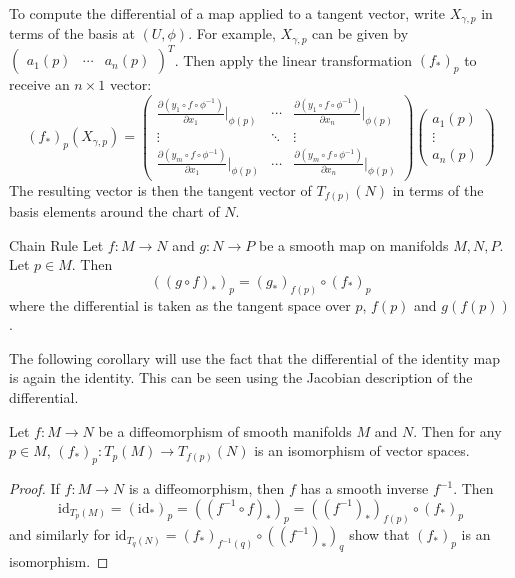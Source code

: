 \documentclass[a4paper]{article}
\begin{document}
To  compute the differential of a map applied to a tangent vector, write $X_{\gamma,p}$ in terms of the basis at $(U,\phi)$. For example, $X_{\gamma,p}$ can be given by $\begin{pmatrix}
a_1(p) & \cdots & a_n(p)
\end{pmatrix}^T$. Then apply the linear transformation $(f_\ast)_p$ to receive an $n\times 1$ vector: $$(f_\ast)_p(X_{\gamma,p})=\begin{pmatrix}
\frac{\partial(y_1\circ f\circ\phi^{-1})}{\partial x_1}|_{\phi(p)} & \cdots & \frac{\partial (y_1\circ f\circ\phi^{-1})}{\partial x_n}|_{\phi(p)}\\
\vdots & \ddots & \vdots\\
\frac{\partial(y_m\circ f\circ\phi^{-1})}{\partial x_1}|_{\phi(p)} & \cdots & \frac{\partial (y_m\circ f\circ\phi^{-1})}{\partial x_n}|_{\phi(p)}
\end{pmatrix}\begin{pmatrix}
a_1(p)\\
\vdots\\
a_n(p)
\end{pmatrix}$$ The resulting vector is then the tangent vector of $T_{f(p)}(N)$ in terms of the basis elements around the chart of $N$. 

\begin{prp}{Chain Rule}{} Let $f:M\to N$ and $g:N\to P$ be a smooth map on manifolds $M,N,P$. Let $p\in M$. Then $$((g\circ f)_\ast)_p=(g_\ast)_{f(p)}\circ (f_\ast)_p$$ where the differential is taken as the tangent space over $p$, $f(p)$ and $g(f(p))$. 
\end{prp}

The following corollary will use the fact that the differential of the identity map is again the identity. This can be seen using the Jacobian description of the differential. 

\begin{crl}{}{} Let $f:M\to N$ be a diffeomorphism of smooth manifolds $M$ and $N$. Then for any $p\in M$, $(f_\ast)_p:T_p(M)\to T_{f(p)}(N)$ is an isomorphism of vector spaces. \tcbline
\begin{proof}
If $f:M\to N$ is a diffeomorphism, then $f$ has a smooth inverse $f^{-1}$. Then $$\text{id}_{T_p(M)}=(\text{id}_\ast)_p=((f^{-1}\circ f)_\ast)_p=((f^{-1})_\ast)_{f(p)}\circ(f_\ast)_p$$ and similarly for $\text{id}_{T_q(N)}=(f_\ast)_{f^{-1}(q)}\circ((f^{-1})_\ast)_q$ show that $(f_\ast)_p$ is an isomorphism. 
\end{proof}
\end{crl}
\end{document}
